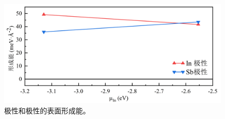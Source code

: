 \begin{figure}[htb]
    \includegraphics{pic/IS_DFT_surfaceE_InPSbP.png}
    \caption{极性和极性的表面形成能。}
    \label{fig:IS_DFT_surfaceE_InPSbP}
\end{figure}

